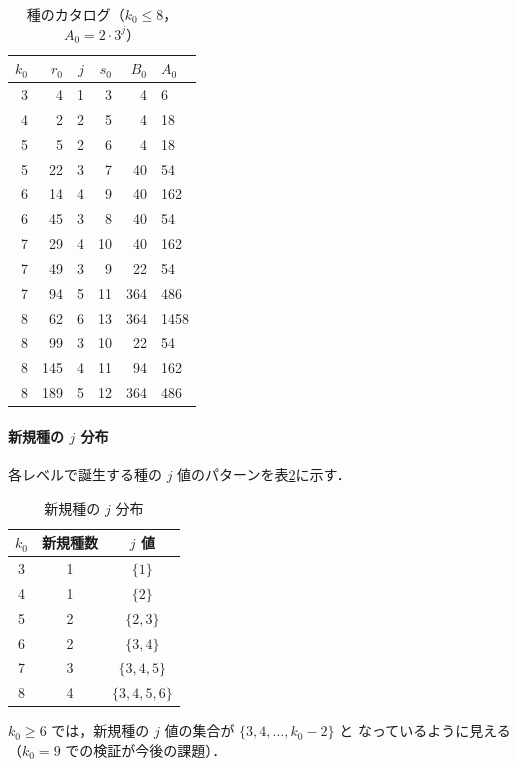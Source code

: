 \documentclass[twocolumn,a4paper,10pt]{jsarticle}
\begin{document}
\begin{table}[h]
\centering
\small
\caption{種のカタログ（$k_0 \leq 8$，$A_0 = 2\cdot 3^j$）}
\label{tab:seeds}
\begin{tabular}{rrrrrl}
\toprule
$k_0$ & $r_0$ & $j$ & $s_0$ & $B_0$ & $A_0$ \\
\midrule
3  &   4  & 1 &  3 &   4  & 6 \\
4  &   2  & 2 &  5 &   4  & 18 \\
5  &   5  & 2 &  6 &   4  & 18 \\
5  &  22  & 3 &  7 &  40  & 54 \\
6  &  14  & 4 &  9 &  40  & 162 \\
6  &  45  & 3 &  8 &  40  & 54 \\
7  &  29  & 4 & 10 &  40  & 162 \\
7  &  49  & 3 &  9 &  22  & 54 \\
7  &  94  & 5 & 11 & 364  & 486 \\
8  &  62  & 6 & 13 & 364  & 1458 \\
8  &  99  & 3 & 10 &  22  & 54 \\
8  & 145  & 4 & 11 &  94  & 162 \\
8  & 189  & 5 & 12 & 364  & 486 \\
\bottomrule
\end{tabular}
\end{table}

\paragraph{新規種の $j$ 分布}
各レベルで誕生する種の $j$ 値のパターンを表\ref{tab:jdist}に示す．

\begin{table}[h]
\centering
\small
\caption{新規種の $j$ 分布}
\label{tab:jdist}
\begin{tabular}{ccc}
\toprule
$k_0$ & 新規種数 & $j$ 値 \\
\midrule
3 & 1 & $\{1\}$ \\
4 & 1 & $\{2\}$ \\
5 & 2 & $\{2, 3\}$ \\
6 & 2 & $\{3, 4\}$ \\
7 & 3 & $\{3, 4, 5\}$ \\
8 & 4 & $\{3, 4, 5, 6\}$ \\
\bottomrule
\end{tabular}
\end{table}

$k_0 \geq 6$ では，新規種の $j$ 値の集合が $\{3, 4, \ldots, k_0 - 2\}$ と
なっているように見える（$k_0 = 9$ での検証が今後の課題）．
\end{document}
